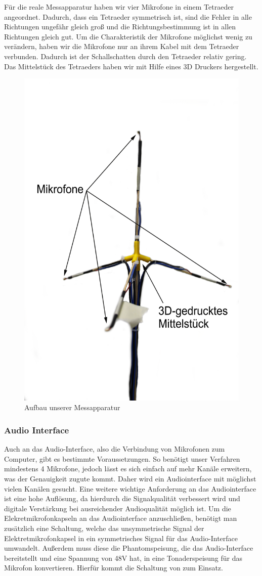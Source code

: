 Für die reale Messapparatur haben wir vier Mikrofone in einem Tetraeder angeordnet. Dadurch, dass ein Tetraeder symmetrisch ist, sind die Fehler in alle Richtungen ungefähr gleich groß und die Richtungsbestimmung ist in allen Richtungen gleich gut. Um die Charakteristik der Mikrofone möglichst wenig zu verändern, haben wir die Mikrofone nur an ihrem Kabel mit dem Tetraeder verbunden. Dadurch ist der Schallschatten durch den Tetraeder relativ gering. Das Mittelstück des Tetraeders haben wir mit Hilfe eines 3D Druckers hergestellt.
\begin{figure}[H]
  \begin{center}
    \includegraphics[width=0.35\linewidth]{img/tet}
  \end{center}
  \caption{Aufbau unserer Messapparatur}
\end{figure}
\subsubsection{Audio Interface}
Auch an das Audio-Interface, also die Verbindung von Mikrofonen zum Computer, gibt es bestimmte Voraussetzungen. So benötigt unser Verfahren mindestens 4 Mikrofone, jedoch lässt es sich einfach auf mehr Kanäle erweitern, was der Genauigkeit zugute kommt. Daher wird ein Audiointerface mit möglichst vielen Kanälen gesucht. Eine weitere wichtige Anforderung an das Audiointerface ist eine hohe Auflösung, da hierdurch die Signalqualität verbessert wird und digitale Verstärkung bei ausreichender Audioqualität möglich ist. Um die Elekretmikrofonkapseln an das Audiointerface anzuschließen, benötigt man zusätzlich eine Schaltung, welche das unsymmetrische Signal der Elektretmikrofonkapsel in ein symmetrisches Signal für das Audio-Interface umwandelt. Außerdem muss diese die Phantomspeisung, die das Audio-Interface bereitstellt und eine Spannung von 48V hat, in eine Tonaderspeisung für das Mikrofon konvertieren. Hierfür kommt die Schaltung von \cite{Powering_microphones} zum Einsatz.


